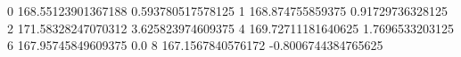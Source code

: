 0 168.55123901367188 0.593780517578125
1 168.874755859375 0.91729736328125
2 171.58328247070312 3.625823974609375
4 169.72711181640625 1.7696533203125
6 167.95745849609375 0.0
8 167.1567840576172 -0.8006744384765625
